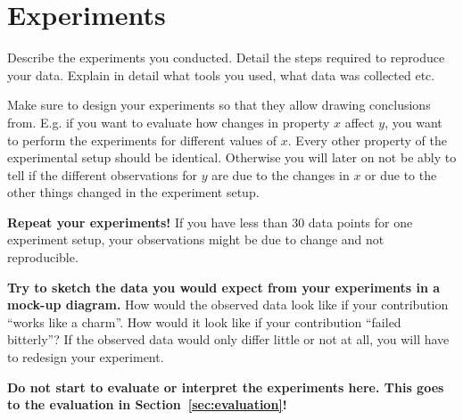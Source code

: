 \section{Experiments}
\label{sec:experiments}
Describe the experiments you conducted.
Detail the steps required to reproduce your data.
Explain in detail what tools you used, what data was collected etc.

Make sure to design your experiments so that they allow drawing conclusions from.
E.g. if you want to evaluate how changes in property $x$ affect $y$, you want to perform the experiments for different values of $x$.
Every other property of the experimental setup should be identical.
Otherwise you will later on not be ably to tell if the different observations for $y$ are due to the changes in $x$ or due to the other things changed in the experiment setup.

\textbf{Repeat your experiments!}
If you have less than 30 data points for one experiment setup, your observations might be due to change and not reproducible.

\textbf{Try to sketch the data you would expect from your experiments in a mock-up diagram.}
How would the observed data look like if your contribution ``works like a charm''.
How would it look like if your contribution ``failed bitterly''?
If the observed data would only differ little or not at all, you will have to redesign your experiment.

\textbf{Do not start to evaluate or interpret the experiments here.
This goes to the evaluation in Section~\ref{sec:evaluation}!}
